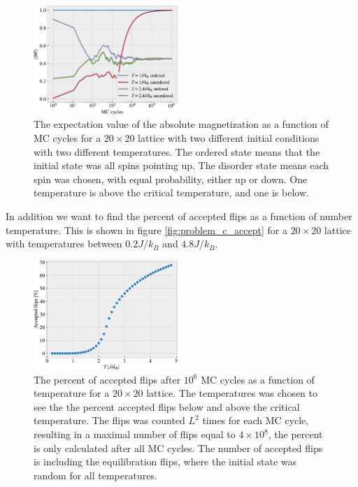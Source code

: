 \documentclass[%
 reprint,
nofootinbib,
aps,
]{revtex4-1}
\begin{document}
\begin{figure}
  \includegraphics[width=0.485\textwidth]{../figures/problem_c_M.pdf}
  \caption{The expectation value of the absolute magnetization as a function of MC cycles for a $20\times 20$ lattice with two different initial conditions with two different temperatures. The ordered state means that the initial state was all spins pointing up. The disorder state means each spin was chosen, with equal probability, either up or down. One temperature is above the critical temperature, and one is below.}
  \label{fig:problem_c_M}
\end{figure}

In addition we want to find the percent of accepted flips as a function of number temperature. This is shown in figure \vref{fig:problem_c_accept} for a $20\times 20$ lattice with temperatures between $0.2J/k_B$ and $4.8J/k_B$.

\begin{figure}
  \centering
  \includegraphics[width=0.485\textwidth]{../figures/problem_c_2.pdf}
  \caption{The percent of accepted flips after $10^6$ MC cycles as a function of temperature for a $20\times 20$ lattice. The temperatures was chosen to see the the percent accepted flips below and above the critical temperature. The flips was counted $L^2$ times for each MC cycle, resulting in a maximal number of flips equal to $4\times 10^8$, the percent is only calculated after all MC cycles. The number of accepted flips is including the equilibration flips, where the initial state was random for all temperatures.}
  \label{fig:problem_c_accept}
\end{figure}
\end{document}
